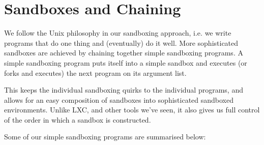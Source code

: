 
\section{Sandboxes and Chaining}

\label{section:assessment-engine:sandboxes-and-chaining}

We follow the Unix philosophy\cite{salus-1994} in our sandboxing approach, i.e.
we write programs that do one thing and (eventually) do it well. More
sophisticated sandboxes are achieved by chaining together simple sandboxing
programs. A simple sandboxing program puts itself into a simple sandbox and
executes (or forks and executes) the next program on its argument list.

This keeps the individual sandboxing quirks to the individual programs, and
allows for an easy composition of sandboxes into sophisticated sandboxed
environments. Unlike LXC, and other tools we've seen, it also gives us full
control of the order in which a sandbox is constructed.

Some of our simple sandboxing programs are summarised below:

